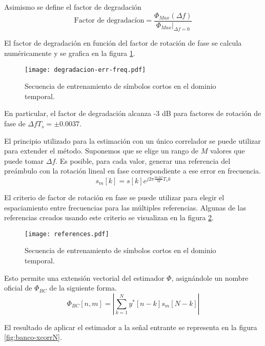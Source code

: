 Asimismo se define el factor de degradación
\begin{equation}
    \text{Factor de degradacíon} = \frac{\Phi_{Max}(\Delta f)}{\Phi_{Max}\lvert_{\Delta f = 0}}
\end{equation}

El factor de degradación en función del factor de rotación de fase se calcula numéricamente y se grafica en la figura \ref{fig:degradacion}.\\
\begin{figure}[ht]
    \centering{}\texttt{[image: degradacion-err-freq.pdf]}
    \caption{Secuencia de entrenamiento de símbolos cortos en el dominio temporal.\label{fig:degradacion}}  
\end{figure}

En particular, el factor de degradación alcanza -3 dB para factores de rotación de fase de $\Delta f T_s = \pm 0.0037$.

El principio utilizado para la estimación con un único correlador se puede utilizar para extender el método. Suponemos que se elige un rango de $M$ valores que puede tomar $\Delta f$. Es posible, para cada valor, generar una referencia del preámbulo con la rotación lineal en fase correspondiente a ese error en frecuencia.\\
\begin{equation}
    s_m[k] = s[k] e^{j2\pi \frac{m\Delta f}{M} T_s k}
\end{equation}

El criterio de factor de rotación en fase se puede utilizar para elegir el espaciamiento entre frecuencias para las múltiples referencias. Algunas de las referencias creados usando este criterio se visualizan en la figura \ref{fig:references}.\\
\begin{figure}[ht]
    \centering{}\texttt{[image: references.pdf]}
    \caption{Secuencia de entrenamiento de símbolos cortos en el dominio temporal.\label{fig:references}}  
\end{figure}


Esto permite una extensión vectorial del estimador $\Phi$, asignándole un nombre oficial de $\Phi_{BC}$ de la siguiente forma.
\begin{equation}\label{eq:correladores-banco}
    \Phi_{BC}[n,m] = \left\lvert \sum_{k=1}^{N}y^\ast[n-k]s_m[N-k] \right\rvert
\end{equation}

El resultado de aplicar el estimador a la señal entrante se representa en la figura \ref{fig:banco-xcorrN}.

